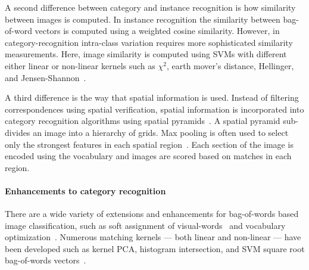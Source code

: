         A second difference between category and instance recognition is how similarity between images is
          computed.
        In instance recognition the similarity between bag-of-word vectors is computed using a weighted cosine
          similarity.
        However, in category-recognition intra-class variation requires more sophisticated similarity
          measurements.
        Here, image similarity is computed using SVMs with different either linear or non-linear kernels such as
          $\chi^2$, earth mover's distance, Hellinger, and Jensen-Shannon~\cite{zhang_local_2006,
          varma_learning_2007, vedaldi_efficient_2012}.

        A third difference is the way that spatial information is used.
        Instead of filtering correspondences using spatial verification, spatial information is incorporated into
          category recognition algorithms using spatial pyramids~\cite{grauman_pyramid_2005, lazebnik_beyond_2006}.
        A spatial pyramid sub-divides an image into a hierarchy of grids.
        Max pooling is often used to select only the strongest features in each spatial
          region~\cite{boureau_theoretical_2010, boureau_learning_2010}.
        Each section of the image is encoded using the vocabulary and images are scored based on matches in each
          region.

        \paragraph{Enhancements to category recognition}
        There are a wide variety of extensions and enhancements for bag-of-words based image classification, such
          as soft assignment of visual-words~\cite{liu_defense_2011} and vocabulary
          optimization~\cite{wang_locality_constrained_2010}.
        Numerous matching kernels --- both linear and non-linear --- have been developed such as kernel PCA,
          histogram intersection, and SVM square root bag-of-words vectors~\cite{vedaldi_multiple_2009,
          maji_classification_2008, perronnin_large_scale_2010}.

